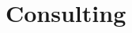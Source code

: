 \documentclass[10pt,a4paper, sans, unicode]{moderncv} %
\begin{document}
\begin{itemize}



\end{itemize}

\section{Consulting}
\end{document}
